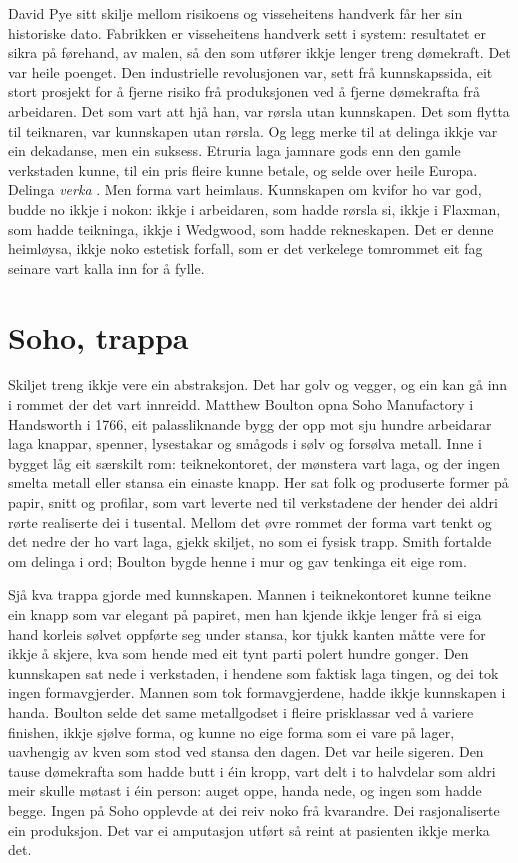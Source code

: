 David Pye sitt skilje mellom risikoens og visseheitens handverk får her sin historiske dato. Fabrikken er visseheitens handverk sett i system: resultatet er sikra på førehand, av malen, så den som utfører ikkje lenger treng dømekraft. Det var heile poenget. Den industrielle revolusjonen var, sett frå kunnskapssida, eit stort prosjekt for å fjerne risiko frå produksjonen ved å fjerne dømekrafta frå arbeidaren. Det som vart att hjå han, var rørsla utan kunnskapen. Det som flytta til teiknaren, var kunnskapen utan rørsla. Og legg merke til at delinga ikkje var ein dekadanse, men ein suksess. Etruria laga jamnare gods enn den gamle verkstaden kunne, til ein pris fleire kunne betale, og selde over heile Europa. Delinga \emph{verka} \autocite{sparke2004}. Men forma vart heimlaus. Kunnskapen om kvifor ho var god, budde no ikkje i nokon: ikkje i arbeidaren, som hadde rørsla si, ikkje i Flaxman, som hadde teikninga, ikkje i Wedgwood, som hadde rekneskapen. Det er denne heimløysa, ikkje noko estetisk forfall, som er det verkelege tomrommet eit fag seinare vart kalla inn for å fylle.

\section{Soho, trappa}

Skiljet treng ikkje vere ein abstraksjon. Det har golv og vegger, og ein kan gå inn i rommet der det vart innreidd. Matthew Boulton opna Soho Manufactory i Handsworth i 1766, eit palassliknande bygg der opp mot sju hundre arbeidarar laga knappar, spenner, lysestakar og smågods i sølv og forsølva metall. Inne i bygget låg eit særskilt rom: teiknekontoret, der mønstera vart laga, og der ingen smelta metall eller stansa ein einaste knapp. Her sat folk og produserte former på papir, snitt og profilar, som vart leverte ned til verkstadene der hender dei aldri rørte realiserte dei i tusental. Mellom det øvre rommet der forma vart tenkt og det nedre der ho vart laga, gjekk skiljet, no som ei fysisk trapp. Smith fortalde om delinga i ord; Boulton bygde henne i mur og gav tenkinga eit eige rom.

Sjå kva trappa gjorde med kunnskapen. Mannen i teiknekontoret kunne teikne ein knapp som var elegant på papiret, men han kjende ikkje lenger frå si eiga hand korleis sølvet oppførte seg under stansa, kor tjukk kanten måtte vere for ikkje å skjere, kva som hende med eit tynt parti polert hundre gonger. Den kunnskapen sat nede i verkstaden, i hendene som faktisk laga tingen, og dei tok ingen formavgjerder. Mannen som tok formavgjerdene, hadde ikkje kunnskapen i handa. Boulton selde det same metallgodset i fleire prisklassar ved å variere finishen, ikkje sjølve forma, og kunne no eige forma som ei vare på lager, uavhengig av kven som stod ved stansa den dagen. Det var heile sigeren. Den tause dømekrafta som hadde butt i éin kropp, vart delt i to halvdelar som aldri meir skulle møtast i éin person: auget oppe, handa nede, og ingen som hadde begge. Ingen på Soho opplevde at dei reiv noko frå kvarandre. Dei rasjonaliserte ein produksjon. Det var ei amputasjon utført så reint at pasienten ikkje merka det.

